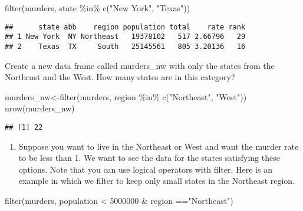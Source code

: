 \documentclass[
]{article}
\newenvironment{Shaded}{\begin{snugshade}}{\end{snugshade}}
\newcommand{\DecValTok}[1]{\textcolor[rgb]{0.00,0.00,0.81}{#1}}
\newcommand{\FunctionTok}[1]{\textcolor[rgb]{0.00,0.00,0.00}{#1}}
\newcommand{\NormalTok}[1]{#1}
\newcommand{\OtherTok}[1]{\textcolor[rgb]{0.56,0.35,0.01}{#1}}
\newcommand{\SpecialCharTok}[1]{\textcolor[rgb]{0.00,0.00,0.00}{#1}}
\newcommand{\StringTok}[1]{\textcolor[rgb]{0.31,0.60,0.02}{#1}}
\providecommand{\tightlist}{%
  \setlength{\itemsep}{0pt}\setlength{\parskip}{0pt}}
\begin{document}
\begin{Shaded}
\begin{Highlighting}[]
\FunctionTok{filter}\NormalTok{(murders, state }\SpecialCharTok{\%in\%} \FunctionTok{c}\NormalTok{(}\StringTok{"New York"}\NormalTok{, }\StringTok{"Texas"}\NormalTok{))}
\end{Highlighting}
\end{Shaded}

\begin{verbatim}
##      state abb    region population total    rate rank
## 1 New York  NY Northeast   19378102   517 2.66796   29
## 2    Texas  TX     South   25145561   805 3.20136   16
\end{verbatim}

Create a new data frame called murders\_nw with only the states from the
Northeast and the West. How many states are in this category?

\begin{Shaded}
\begin{Highlighting}[]
\NormalTok{murders\_nw}\OtherTok{\textless{}{-}}\FunctionTok{filter}\NormalTok{(murders, region }\SpecialCharTok{\%in\%} \FunctionTok{c}\NormalTok{(}\StringTok{"Northeast"}\NormalTok{, }\StringTok{"West"}\NormalTok{))}
\FunctionTok{nrow}\NormalTok{(murders\_nw)}
\end{Highlighting}
\end{Shaded}

\begin{verbatim}
## [1] 22
\end{verbatim}

\begin{enumerate}
\def\labelenumi{\arabic{enumi}.}
\setcounter{enumi}{6}
\tightlist
\item
  Suppose you want to live in the Northeast or West and want the murder
  rate to be less than 1. We want to see the data for the states
  satisfying these options. Note that you can use logical operators with
  filter. Here is an example in which we filter to keep only small
  states in the Northeast region.
\end{enumerate}

\begin{Shaded}
\begin{Highlighting}[]
\FunctionTok{filter}\NormalTok{(murders, population }\SpecialCharTok{\textless{}} \DecValTok{5000000} \SpecialCharTok{\&}\NormalTok{ region }\SpecialCharTok{==}\StringTok{"Northeast"}\NormalTok{)}
\end{Highlighting}
\end{Shaded}
\end{document}

